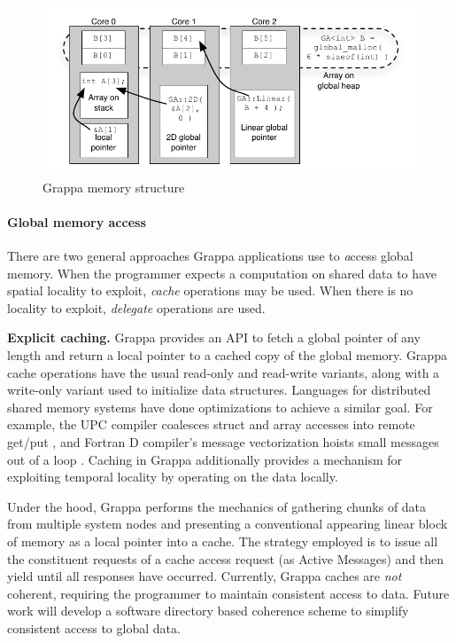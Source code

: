 \begin{figure}[t]
\begin{center}
  \includegraphics[width=0.95\columnwidth]{figs/memory-structure}
\begin{minipage}{0.95\columnwidth}
  \caption{\label{fig:memory-structure} Grappa memory structure}
\end{minipage}
\vspace{-3ex}
\end{center}
\end{figure}

\paragraph{Global memory access} There are two general approaches
Grappa applications use to {\emph access} global memory. When the
programmer expects a computation on shared data to have spatial locality
to exploit, {\em cache} operations may be used. When there is no
locality to exploit, {\em delegate} operations are used.

\textbf{Explicit caching.} Grappa provides an API to fetch a global
pointer of any length and return a local pointer to a cached copy of the
global memory.  Grappa cache operations have the usual read-only and
read-write variants, along with a write-only variant used to initialize
data structures. Languages for distributed shared memory systems have
done optimizations to achieve a similar goal. For example, the UPC
compiler coalesces struct and array accesses into remote get/put
\cite{Chen:2005}, and Fortran D compiler's message vectorization hoists
small messages out of a loop \cite{FortranD:1992}. Caching in Grappa
additionally provides a mechanism for exploiting temporal locality by
operating on the data locally.
 
Under the hood, Grappa performs the mechanics of gathering chunks of
data from multiple system nodes and presenting a conventional appearing
linear block of memory as a local pointer into a cache. The strategy
employed is to issue all the constituent requests of a cache access
request  (as Active Messages) and then yield until all responses have
occurred.  Currently, Grappa caches are \emph{not} coherent, requiring
the programmer to maintain consistent access to data.  Future work will
develop a software directory based coherence scheme to simplify
consistent access to global data.

